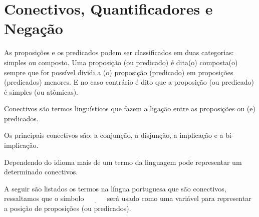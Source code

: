 \section{Conectivos, Quantificadores e Negação}\label{sec:Conectivo-Quantificador-Negacao}

As proposições e os predicados podem ser classificados em duas categorias: simples ou composto. Uma proposição (ou predicado) é dita(o) composta(o) sempre que for possível dividi a (o) proposição (predicado) em proposições (predicados) menores. E no caso contrário é dito que a proposição (ou predicado) é simples (ou atômicas).

\begin{definition}[Conectivos]\label{def:Conectivos}
	Conectivos são termos linguísticos que fazem a ligação entre as proposições ou (e) predicados.
\end{definition}

Os principais conectivos são: a conjunção, a disjunção, a implicação e a bi-implicação.

\begin{remark}
    Dependendo do idioma mais de um termo da linguagem pode representar um determinado conectivos.
\end{remark}

A seguir são listados os termos na língua portuguesa que são conectivos, ressaltamos que o símbolo $\underline{ \ \ \ \ \ \ \ \ \ \ \ \ }$ será usado como uma variável para representar a posição de proposições (ou predicados).

